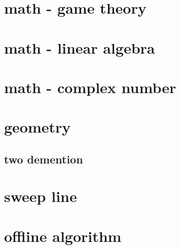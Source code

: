 \documentclass[UTF8, a4paper, titlepage, twoside]{ctexart}
\begin{document}
\section{math - game theory}
  

\section{math - linear algebra}
  
  
  

\section{math - complex number}
  

\section{geometry}
  \subsection{ two demention }


\section{sweep line}

\section{offline algorithm}
\end{document}
